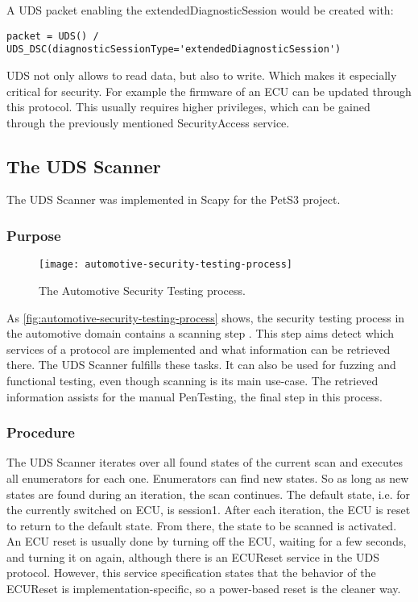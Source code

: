 A UDS packet enabling the extendedDiagnosticSession would be created with:

\begin{samepage}
\begin{verbatim}
packet = UDS() / UDS_DSC(diagnosticSessionType='extendedDiagnosticSession')
\end{verbatim}
\end{samepage}

UDS not only allows to read data, but also to write. Which makes it especially critical for security. For example the firmware of an ECU can be updated through this protocol. This usually requires higher privileges, which can be gained through the previously mentioned SecurityAccess service.


\subsection{The UDS Scanner}

The UDS Scanner was implemented in Scapy for the PetS3 project.

\subsubsection{Purpose}

\begin{figure}[h]
    \centering
    \texttt{[image: automotive-security-testing-process]}
    \caption{The Automotive Security Testing process.}
    \label{fig:automotive-security-testing-process}
\end{figure}

As \autoref{fig:automotive-security-testing-process} shows, the security testing process in the automotive domain contains a scanning step \cite{Bayer2015}. This step aims detect which services of a protocol are implemented and what information can be retrieved there. The UDS Scanner fulfills these tasks. It can also be used for fuzzing and functional testing, even though scanning is its main use-case. The retrieved information assists for the manual PenTesting, the final step in this process.

\subsubsection{Procedure}

The UDS Scanner iterates over all found states of the current scan and executes all enumerators for each one. Enumerators can find new states. So as long as new states are found during an iteration, the scan continues. The default state, i.e. for the currently switched on ECU, is session1. After each iteration, the ECU is reset to return to the default state. From there, the state to be scanned is activated. An ECU reset is usually done by turning off the ECU, waiting for a few seconds, and turning it on again, although there is an ECUReset service in the UDS protocol. However, this service specification states that the behavior of the ECUReset is implementation-specific, so a power-based reset is the cleaner way.

